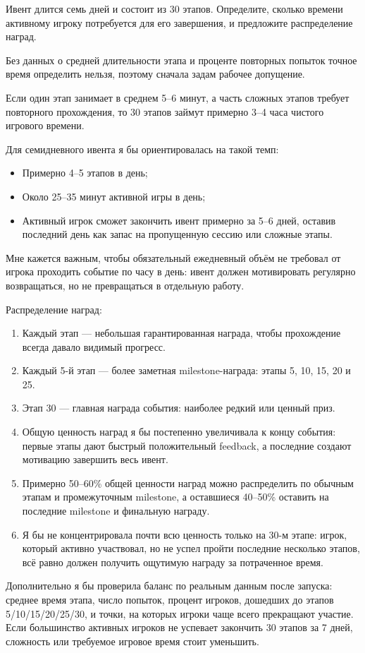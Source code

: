 \documentclass{ZGJournalArticle_2026}
\providecommand{\tightlist}{%
  \setlength{\itemsep}{0pt}\setlength{\parskip}{0pt}}
\begin{document}
Ивент длится семь дней и состоит из 30 этапов. Определите, сколько
времени активному игроку потребуется для его завершения, и предложите
распределение наград.

Без данных о средней длительности этапа и проценте повторных попыток
точное время определить нельзя, поэтому сначала задам рабочее допущение.

Если один этап занимает в среднем 5--6 минут, а часть сложных этапов
требует повторного прохождения, то 30 этапов займут примерно 3--4 часа
чистого игрового времени.

Для семидневного ивента я бы ориентировалась на такой темп:

\begin{itemize}
\tightlist
\item
  Примерно 4--5 этапов в день;
\item
  Около 25--35 минут активной игры в день;
\item
  Активный игрок сможет закончить ивент примерно за 5--6 дней, оставив
  последний день как запас на пропущенную сессию или сложные этапы.
\end{itemize}

Мне кажется важным, чтобы обязательный ежедневный объём не требовал от
игрока проходить событие по часу в день: ивент должен мотивировать
регулярно возвращаться, но не превращаться в отдельную работу.

Распределение наград:

\begin{enumerate}
\def\labelenumi{\arabic{enumi}.}
\tightlist
\item
  Каждый этап --- небольшая гарантированная награда, чтобы прохождение
  всегда давало видимый прогресс.
\item
  Каждый 5-й этап --- более заметная milestone-награда: этапы 5, 10, 15,
  20 и 25.
\item
  Этап 30 --- главная награда события: наиболее редкий или ценный приз.
\item
  Общую ценность наград я бы постепенно увеличивала к концу события:
  первые этапы дают быстрый положительный feedback, а последние создают
  мотивацию завершить весь ивент.
\item
  Примерно 50--60\% общей ценности наград можно распределить по обычным
  этапам и промежуточным milestone, а оставшиеся 40--50\% оставить на
  последние milestone и финальную награду.
\item
  Я бы не концентрировала почти всю ценность только на 30-м этапе:
  игрок, который активно участвовал, но не успел пройти последние
  несколько этапов, всё равно должен получить ощутимую награду за
  потраченное время.
\end{enumerate}

Дополнительно я бы проверила баланс по реальным данным после запуска:
среднее время этапа, число попыток, процент игроков, дошедших до этапов
5/10/15/20/25/30, и точки, на которых игроки чаще всего прекращают
участие. Если большинство активных игроков не успевает закончить 30
этапов за 7 дней, сложность или требуемое игровое время стоит уменьшить.
\end{document}
